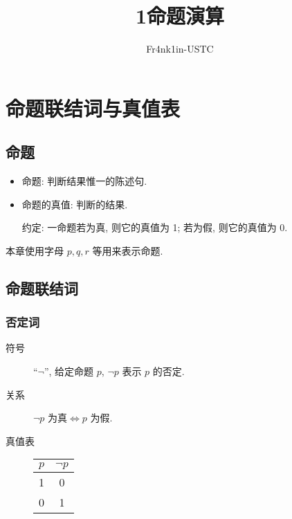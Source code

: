 \documentclass[
    mode=hazy,
    color=blue,
    device=normal,
    lang=cn
]{elegantnote}
\title{1\hspace{.5cm}命题演算}
\author{Fr4nk1in-USTC}
\institute{中国科学技术大学计算机学院}
\date{\zhtoday}
\begin{document}
    \maketitle
    \section{命题联结词与真值表}
        \subsection{命题}
            \begin{itemize}
                \item 命题: 判断结果惟一的陈述句.
                \item 命题的真值: 判断的结果.

                约定: 一命题若为真, 则它的真值为 1; 若为假, 则它的真值为 0.
            \end{itemize}
            本章使用字母 $p,q,r$ 等用来表示命题.
        \subsection{命题联结词}
            \subsubsection{否定词}
                \begin{description}
                    \item[符号] ``$\lnot$'', 给定命题 $p$, $\lnot p$ 表示 $p$ 的否定.
                    \item[关系] $\lnot p\text{ 为真}\Leftrightarrow p\text{ 为假}$.
                    \item[真值表] 
                        \begin{tabular}{c|c}
                            $p$ & $\lnot p$ \\
                            \hline
                            1 & 0\\
                            0 & 1
                        \end{tabular}
                \end{description}
\end{document}
